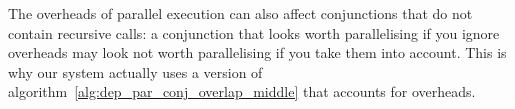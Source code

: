 {%

The overheads of parallel execution can also affect conjunctions
that do not contain recursive calls:
a conjunction that looks worth parallelising if you ignore overheads
may look not worth parallelising if you take them into account.
This is why our system actually uses
a version of algorithm~\ref{alg:dep_par_conj_overlap_middle}
that accounts for overheads.

}
